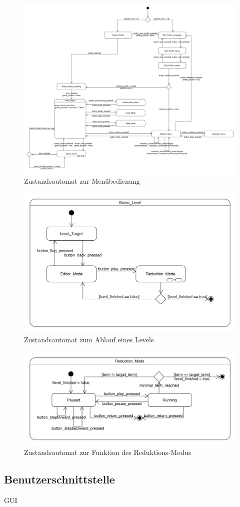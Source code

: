 \begin{figure}[h]
\centering
\includegraphics[scale=0.3]{../system_models/dynamic_models/menu_state_machine.pdf}
\caption{Zustandsautomat zur Menübedienung}
\end{figure}

\begin{figure}[h]
\centering
\includegraphics[scale=0.6]{../system_models/dynamic_models/game_level_state_machine.pdf}
\caption{Zustandsautomat zum Ablauf eines Levels}
\end{figure}

\begin{figure}[h]
\centering
\includegraphics[scale=0.6]{../system_models/dynamic_models/reduction_mode_state_machine.pdf}
\caption{Zustandsautomat zur Funktion des Reduktions-Modus}
\end{figure}

\subsection{Benutzerschnittstelle}

GUI